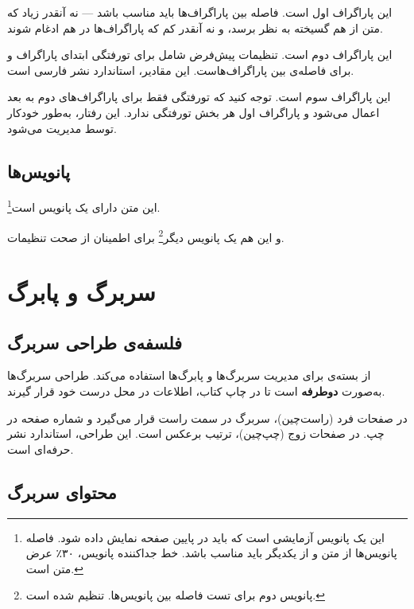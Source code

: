 \documentclass{matinbook}
\begin{document}
این پاراگراف اول است. فاصله بین پاراگراف‌ها باید مناسب باشد
--- نه آنقدر زیاد که متن از هم گسیخته به نظر برسد، و نه
آنقدر کم که پاراگراف‌ها در هم ادغام شوند.

این پاراگراف دوم است. تنظیمات پیش‌فرض  شامل
 برای تورفتگی ابتدای
پاراگراف و  برای فاصله‌ی
بین پاراگراف‌هاست. این مقادیر، استاندارد نشر فارسی است.

این پاراگراف سوم است. توجه کنید که تورفتگی فقط برای
پاراگراف‌های دوم به بعد اعمال می‌شود و پاراگراف اول هر
بخش تورفتگی ندارد. این رفتار، به‌طور خودکار توسط
 مدیریت می‌شود.

\section{پانویس‌ها}
\label{sec:geometry-footnotes}

این متن دارای یک پانویس است\footnote{این یک پانویس آزمایشی
است که باید در پایین صفحه نمایش داده شود. فاصله پانویس‌ها
از متن و از یکدیگر باید مناسب باشد. خط جداکننده پانویس،
۳۰٪ عرض متن است.}.

و این هم یک پانویس دیگر\footnote{پانویس دوم برای تست فاصله
بین پانویس‌ها.  تنظیم
شده است.} برای اطمینان از صحت تنظیمات.

\chapter{سربرگ و پابرگ}
\label{chap:headers}

\section{فلسفه‌ی طراحی سربرگ}
\label{sec:headers-philosophy}

 از بسته‌ی  برای مدیریت سربرگ‌ها
و پابرگ‌ها استفاده می‌کند. طراحی سربرگ‌ها به‌صورت \textbf{دوطرفه}
است تا در چاپ کتاب، اطلاعات در محل درست خود قرار گیرند.

در صفحات فرد (راست‌چین)، سربرگ در سمت راست قرار می‌گیرد و
شماره صفحه در چپ. در صفحات زوج (چپ‌چین)، ترتیب برعکس است.
این طراحی، استاندارد نشر حرفه‌ای است.

\section{محتوای سربرگ}
\label{sec:headers-content}
\end{document}
